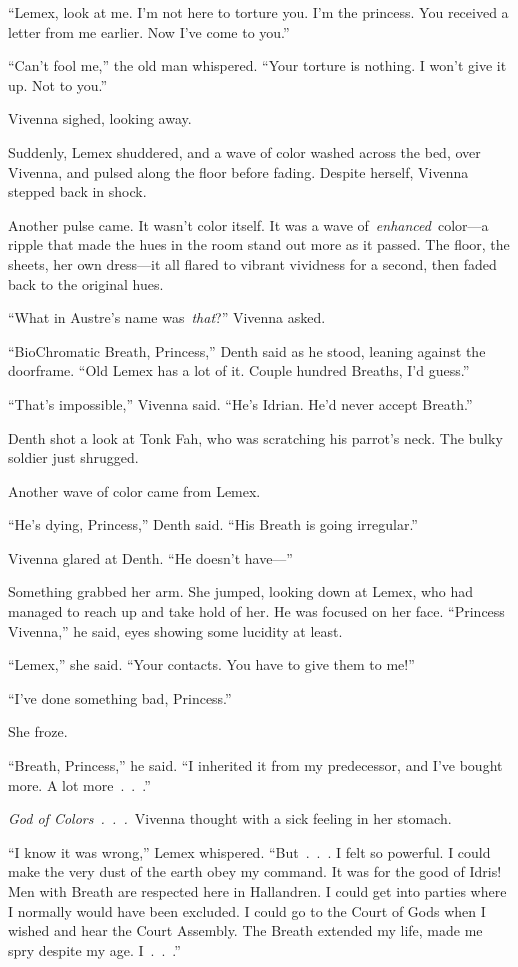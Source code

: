 “Lemex, look at me. I’m not here to torture you. I’m the princess. You received a letter from me earlier. Now I’ve come to you.”

“Can’t fool me,” the old man whispered. “Your torture is nothing. I won’t give it up. Not to you.”

Vivenna sighed, looking away.

Suddenly, Lemex shuddered, and a wave of color washed across the bed, over Vivenna, and pulsed along the floor before fading. Despite herself, Vivenna stepped back in shock.

Another pulse came. It wasn’t color itself. It was a wave of~\textit{enhanced}~color—a ripple that made the hues in the room stand out more as it passed. The floor, the sheets, her own dress—it all flared to vibrant vividness for a second, then faded back to the original hues.

“What in Austre’s name was~\textit{that}?” Vivenna asked.

“BioChromatic Breath, Princess,” Denth said as he stood, leaning against the doorframe. “Old Lemex has a lot of it. Couple hundred Breaths, I’d guess.”

“That’s impossible,” Vivenna said. “He’s Idrian. He’d never accept Breath.”

Denth shot a look at Tonk Fah, who was scratching his parrot’s neck. The bulky soldier just shrugged.

Another wave of color came from Lemex.

“He’s dying, Princess,” Denth said. “His Breath is going irregular.”

Vivenna glared at Denth. “He doesn’t have—”

Something grabbed her arm. She jumped, looking down at Lemex, who had managed to reach up and take hold of her. He was focused on her face. “Princess Vivenna,” he said, eyes showing some lucidity at least.

“Lemex,” she said. “Your contacts. You have to give them to me!”

“I’ve done something bad, Princess.”

She froze.

“Breath, Princess,” he said. “I inherited it from my predecessor, and I’ve bought more. A lot more~.~.~.”

\textit{God of Colors~.~.~.}~Vivenna thought with a sick feeling in her stomach.

“I know it was wrong,” Lemex whispered. “But~.~.~. I felt so powerful. I could make the very dust of the earth obey my command. It was for the good of Idris! Men with Breath are respected here in Hallandren. I could get into parties where I normally would have been excluded. I could go to the Court of Gods when I wished and hear the Court Assembly. The Breath extended my life, made me spry despite my age. I~.~.~.”

